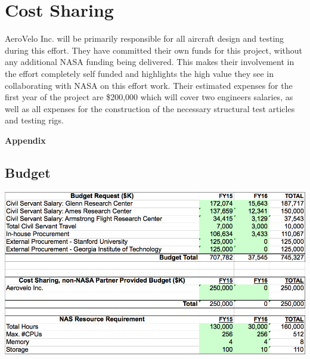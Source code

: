 \documentclass[]{aiaa-tc}
\begin{document}
  \section{Cost Sharing}
    AeroVelo Inc. will be primarily responsible for all aircraft design and testing during this effort. 
    They have committed their own funds for this project, without any additional NASA funding being delivered.
    This makes their involvement in the effort completely self funded and highlights the high value they see 
    in collaborating with NASA on this effort work. Their estimated expenses for the first year of the project are \$200,000 
    which will cover two engineers salaries, as well as all expenses for the construction of the necessary 
    structural test articles and testing rigs. 



  \clearpage
  

  \appendix

  \clearpage
  \centerline{\huge{\textbf{Appendix}}}

  \begin{landscape}
  \section{Budget}
    \centering
    \includegraphics[height=\textheight]{images/budget_request}
    \end{landscape}
\end{document}
